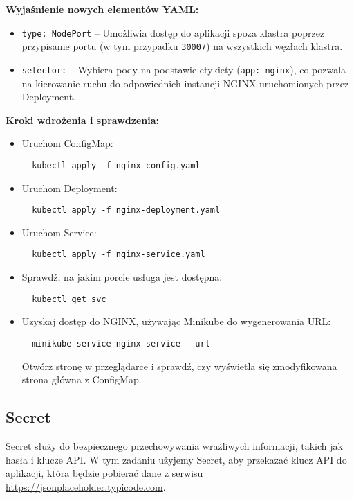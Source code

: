 \documentclass{article}
\begin{document}
\textbf{Wyjaśnienie nowych elementów YAML:}
\begin{itemize}
  \item \texttt{type: NodePort} – Umożliwia dostęp do aplikacji spoza klastra poprzez przypisanie portu (w tym przypadku \texttt{30007}) na wszystkich węzłach klastra.
  \item \texttt{selector:} – Wybiera pody na podstawie etykiety (\texttt{app: nginx}), co pozwala na kierowanie ruchu do odpowiednich instancji NGINX uruchomionych przez Deployment.
\end{itemize}

\textbf{Kroki wdrożenia i sprawdzenia:}
\begin{itemize}
  \item Uruchom ConfigMap:
  \begin{lstlisting}
  kubectl apply -f nginx-config.yaml
  \end{lstlisting}
  \item Uruchom Deployment:
  \begin{lstlisting}
  kubectl apply -f nginx-deployment.yaml
  \end{lstlisting}
  \item Uruchom Service:
  \begin{lstlisting}
  kubectl apply -f nginx-service.yaml
  \end{lstlisting}
  \item Sprawdź, na jakim porcie usługa jest dostępna:
  \begin{lstlisting}
  kubectl get svc
  \end{lstlisting}
  \item Uzyskaj dostęp do NGINX, używając Minikube do wygenerowania URL:
  \begin{lstlisting}
  minikube service nginx-service --url
  \end{lstlisting}
  Otwórz stronę w przeglądarce i sprawdź, czy wyświetla się zmodyfikowana strona główna z ConfigMap.
\end{itemize}

\subsection{Secret}

Secret służy do bezpiecznego przechowywania wrażliwych informacji, takich jak hasła i klucze API. W tym zadaniu użyjemy Secret, aby przekazać klucz API do aplikacji, która będzie pobierać dane z serwisu \url{https://jsonplaceholder.typicode.com}.
\end{document}
